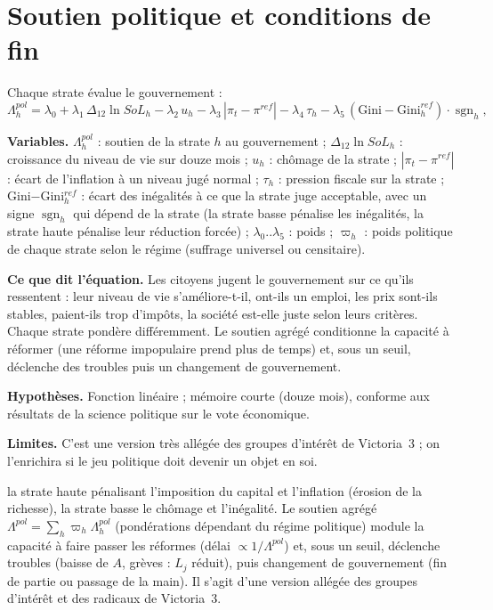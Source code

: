 \documentclass[11pt,a4paper]{article}
\newcommand{\variables}{\par\noindent\textbf{Variables.} }
\newcommand{\sens}{\par\noindent\textbf{Ce que dit l'équation.} }
\newcommand{\hyp}{\par\noindent\textbf{Hypothèses.} }
\newcommand{\limites}{\par\noindent\textbf{Limites.} }
\DeclareMathOperator{\sgn}{sgn}
\begin{document}
\section{Soutien politique et conditions de fin}
\label{sec:politique}
Chaque strate évalue le gouvernement :
\begin{equation}
\Lambda^{pol}_h = \lambda_0 + \lambda_1\, \Delta_{12}\ln SoL_h - \lambda_2\, u_h - \lambda_3\, |\pi_t - \pi^{ref}| - \lambda_4\, \tau_h - \lambda_5\, (\text{Gini} - \text{Gini}^{ref}_h)\cdot \sgn_h ,
\end{equation}
\begin{lecture}
\variables $\Lambda^{pol}_h$ : soutien de la strate $h$ au gouvernement ; $\Delta_{12}\ln SoL_h$ : croissance du niveau de vie sur douze mois ; $u_h$ : chômage de la strate ; $|\pi_t-\pi^{ref}|$ : écart de l'inflation à un niveau jugé normal ; $\tau_h$ : pression fiscale sur la strate ; Gini$-$Gini$^{ref}_h$ : écart des inégalités à ce que la strate juge acceptable, avec un signe $\sgn_h$ qui dépend de la strate (la strate basse pénalise les inégalités, la strate haute pénalise leur réduction forcée) ; $\lambda_0..\lambda_5$ : poids ; $\varpi_h$ : poids politique de chaque strate selon le régime (suffrage universel ou censitaire).
\sens Les citoyens jugent le gouvernement sur ce qu'ils ressentent : leur niveau de vie s'améliore-t-il, ont-ils un emploi, les prix sont-ils stables, paient-ils trop d'impôts, la société est-elle juste selon leurs critères. Chaque strate pondère différemment. Le soutien agrégé conditionne la capacité à réformer (une réforme impopulaire prend plus de temps) et, sous un seuil, déclenche des troubles puis un changement de gouvernement.
\hyp Fonction linéaire ; mémoire courte (douze mois), conforme aux résultats de la science politique sur le vote économique.
\limites C'est une version très allégée des groupes d'intérêt de Victoria~3 ; on l'enrichira si le jeu politique doit devenir un objet en soi.
\end{lecture}
la strate haute pénalisant l'imposition du capital et l'inflation (érosion de la richesse), la strate basse le chômage et l'inégalité. Le soutien agrégé $\Lambda^{pol} = \sum_h \varpi_h \Lambda^{pol}_h$ (pondérations dépendant du régime politique) module la capacité à faire passer les réformes (délai $\propto 1/\Lambda^{pol}$) et, sous un seuil, déclenche troubles (baisse de $A$, grèves : $L_j$ réduit), puis changement de gouvernement (fin de partie ou passage de la main). Il s'agit d'une version allégée des groupes d'intérêt et des radicaux de Victoria~3.
\end{document}
